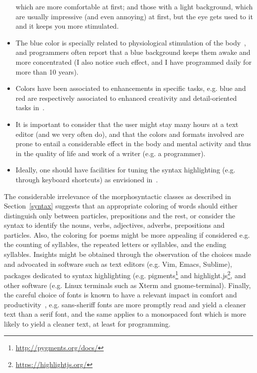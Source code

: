 \documentclass{article}
\begin{document}
\begin{itemize}
  which are more comfortable at first; and those with a light background,
  which are usually impressive (and even annoying) at first,
  but the eye gets used to it and it keeps you more stimulated.
\item The blue color is specially related to physiological
  stimulation of the body~\cite{blue,blue2},
    and programmers often report that a blue background keeps them
    awake and more concentrated (I also notice such effect,
    and I have programmed daily for more than 10 years).
  \item Colors have been associated to enhancements in specific tasks,
    e.g. blue and red are respectively associated to enhanced
    creativity and detail-oriented tasks in~\cite{blue}.
  \item It is important to consider that the user might 
    stay many hours
  at a text editor (and we very often do),
    and that the colors and formats involved are
  prone to entail a considerable effect in the body and mental
    activity and thus in the quality of life and work of a writer
    (e.g. a programmer).
  \item Ideally, one should have facilities for tuning 
    the syntax highlighting (e.g. through keyboard shortcuts)
  as envisioned in~\cite{vim}.
\end{itemize}

The considerable irrelevance of the morphosyntactic classes as
described in Section~\ref{syntax} suggests that an appropriate coloring
of words should
either distinguish only between particles, prepositions and the rest,
or consider the syntax to identify the nouns, verbs, adjectives, adverbs,
prepositions and particles.
Also, the coloring for poems might be more appealing if considered
e.g. the counting of syllables, the repeated letters or syllables,
and the ending syllables.
Insights might be obtained through the observation of the
choices made and advocated in software such as text editors
(e.g. Vim, Emacs, Sublime),
packages dedicated to syntax highlighting (e.g.
pigments\footnote{\url{http://pygments.org/docs/}} and 
highlight.js\footnote{\url{https://highlightjs.org/}},
and
other software (e.g. Linux terminals such as Xterm and gnome-terminal).
Finally, the careful choice of fonts is known to have
a relevant impact in comfort and productivity~\cite{fonts},
e.g. sans-sheriff fonts are more promptly read and yield a cleaner
text than a serif font, and the same applies to a monospaced font
which is more likely to yield a cleaner text, at least for programming.
\end{document}
